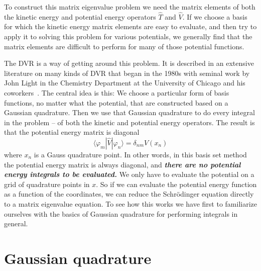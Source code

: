 \documentclass[aps,amssymb,superscriptaddress,floatfix]{revtex4}
\begin{document}
  To construct this matrix eigenvalue problem we need the matrix elements of both the kinetic energy and potential energy operators $\hat{T}$ and $\hat{V}$.  If we choose a basis for which the kinetic energy matrix elements are easy to evaluate, and then try to apply it to solving this problem for various potentials, we generally find that the matrix elements are difficult to perform for many of those potential functions.   

The DVR is a way of getting around this problem.  It is described in an extensive literature on many kinds of DVR that began in the 1980s with seminal work by John Light in the Chemistry Department at the University of Chicago and his coworkers~\cite{LightDVR1986}.  The central idea is this:  We  choose a particular form of basis functions,  no matter what the potential, that are constructed based on a Gaussian quadrature.  Then we use that Gaussian quadrature to do every integral in the problem -- of both the  kinetic and potential  energy operators.  The result is that the potential energy matrix is diagonal 
\begin{equation}
\langle \varphi_m |\hat{V}| \varphi_n \rangle = \delta_{nm} V(x_n)
\end{equation}
where $x_n$ is a Gauss quadrature point.  In other words, in this basis set method the potential energy matrix is always diagonal, and  \textbf{\textit{there are no potential energy integrals to be evaluated.}} We only have to evaluate the potential on a grid of quadrature points in $x$.  So if we can evaluate the potential energy function as a function of the coordinates, we can reduce the Schr\"odinger equation directly to a matrix eigenvalue equation.   To see how this works we have first to  familiarize ourselves with the basics of Gaussian quadrature for performing integrals in general.

\section{Gaussian quadrature}
\label{sec:gaussquad}
\end{document}
